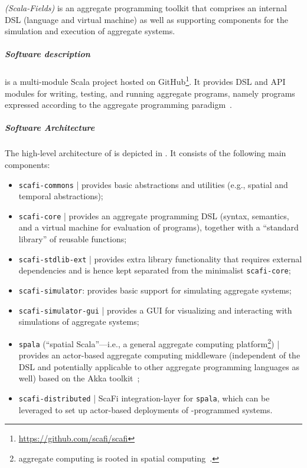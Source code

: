  \emph{\scafi{} (Scala-Fields)} is
 an aggregate programming toolkit
 that comprises an internal DSL (language and virtual machine)
 as well as supporting components for the simulation
 and execution %
 of aggregate systems.

\subparagraph{Software description}
\label{}
\scafi{} is a multi-module Scala project hosted on GitHub\footnote{\url{https://github.com/scafi/scafi}}.
%
It provides DSL and API modules for 
 writing, testing, and running aggregate programs, namely programs expressed according to the aggregate programming paradigm~\cite{aggregatecomputing,DBLP:journals/jlap/ViroliBDACP19}.
%
\subparagraph{Software Architecture}
\label{sec:scafi-arch-design}

The high-level architecture of \scafi{} is depicted in .
It consists of the following main components: %
\begin{itemize}
\item \texttt{scafi-commons} | provides basic abstractions and utilities (e.g., spatial and temporal abstractions);
\item \texttt{scafi-core} | provides an aggregate programming DSL (syntax, semantics, and a virtual machine for evaluation of programs), together with a ``standard library'' of reusable functions;
\item \texttt{scafi-stdlib-ext} | provides extra library functionality that requires external dependencies and is hence kept separated from the minimalist \texttt{scafi-core};
\item \texttt{scafi-simulator}: provides basic support for simulating aggregate systems;
\item \texttt{scafi-simulator-gui} | provides a GUI for visualizing and interacting with simulations of aggregate systems;
\item \texttt{spala} (``spatial Scala''---i.e., a general aggregate computing platform\footnote{aggregate computing is rooted in spatial computing~\cite{DBLP:journals/corr/abs-1202-5509}.}) | provides an actor-based aggregate computing middleware
(independent of the \scafi{} DSL and potentially applicable to other aggregate programming languages as well)
based on the Akka toolkit~\cite{akka};
\item \texttt{scafi-distributed} | ScaFi integration-layer for \texttt{spala},
which can be leveraged to set up actor-based deployments of \scafi{}-programmed systems.
\end{itemize}
 
